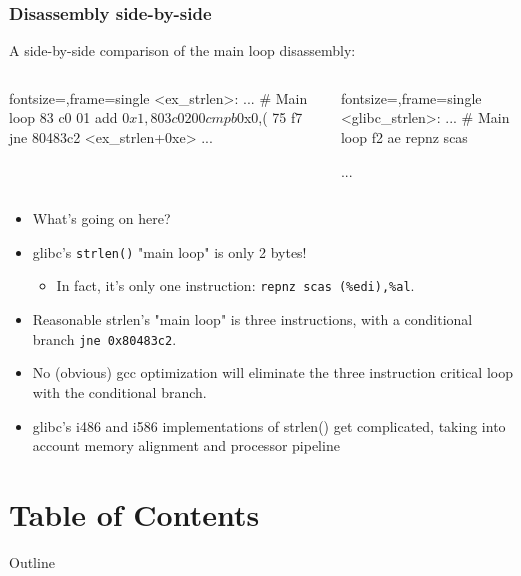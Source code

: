 \documentclass[11pt,xcolor=dvipsnames]{beamer}
\newcommand{\vs}{\vspace{0.5em}}
\newcommand{\mvs}{\vspace{-0.95em}}
\begin{document}
\begin{frame}[fragile,t]
\frametitle{Disassembly side-by-side}
\mvs
A side-by-side comparison of the main loop disassembly:\vspace{-0.8em}
\begin{columns}[T]
\begin{customobjdumpcode*}{fontsize=\fontsize{6.5}{8},frame=single}
<ex_strlen>:
...
# Main loop
83 c0 01        add    $0x1,%
80 3c 02 00     cmpb   $0x0,(%
75 f7           jne    80483c2 <ex_strlen+0xe>
...
\end{customobjdumpcode*}
\begin{customobjdumpcode*}{fontsize=\fontsize{6.5}{8},frame=single}
<glibc_strlen>:
...
# Main loop
f2 ae           repnz scas %


...
\end{customobjdumpcode*}
\end{columns}
\vs
\begin{itemize}
        \item What's going on here?
        \pause
        \item glibc's \verb+strlen()+ "main loop" is only 2 bytes!
        \begin{itemize}
                \item In fact, it's only one instruction: \verb+repnz scas (%edi),%al+.
        \end{itemize}
        \pause
        \item Reasonable strlen's "main loop" is three instructions, with a conditional branch \verb+jne 0x80483c2+.
        \pause
        \item No (obvious) gcc optimization will eliminate the three instruction critical loop with the conditional branch.
        \item glibc's i486 and i586 implementations of {\ttfamily strlen()} get complicated, taking into account memory alignment and processor pipeline
\end{itemize}
\end{frame}

\section*{Table of Contents}
\begin{frame}{Outline}
\tableofcontents[part=1]
\end{frame}
\end{document}
